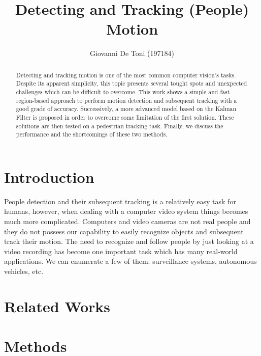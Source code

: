 \documentclass[runningheads]{llncs}
\begin{document}
%
\title{Detecting and Tracking (People) Motion}
%
%
\author{Giovanni De Toni (197184)}
%
%
%
\maketitle              %
%
\begin{abstract}
Detecting and tracking motion is one of the most common computer vision's tasks. Despite its apparent simplicity, this topic presents several tought spots and unexpected challenges which can be difficult to overcome. This work shows a simple and fast region-based approach to perform motion detection and subsequent tracking with a good grade of accuracy. Successively, a more advanced model based on the Kalman Filter is proposed in order to overcome some limitation of the first solution. These solutions are then tested on a pedestrian tracking task. Finally, we discuss the performance and the shortcomings of these two methods. 

\end{abstract}
%
%
%
\section{Introduction}
People detection and their subsequent tracking is a relatively easy task for humans, however, when dealing with a computer video system things becomes much more complicated. Computers and video cameras are not real people and they do not possess our capability to easily recognize objects and subsequent track their motion.  The need to recognize and follow people by just looking at a video recording has become one important task which has many real-world applications. We can enumerate a few of them: surveillance systems, autonomous vehicles, etc. 

\section{Related Works}

\section{Methods}
\end{document}
